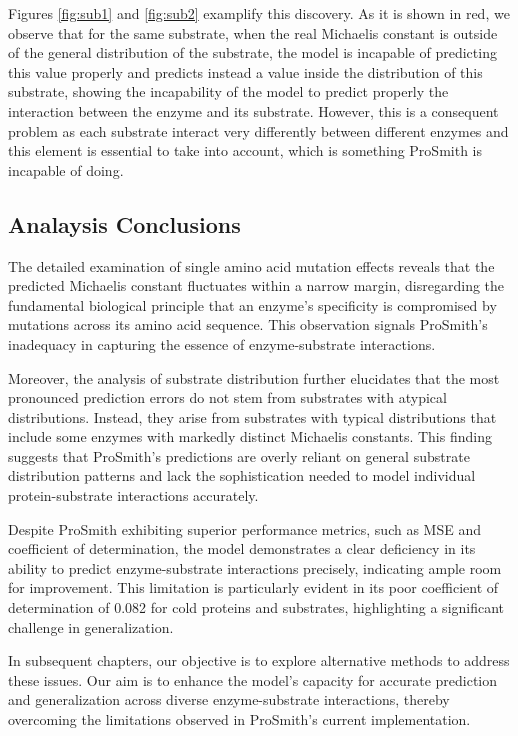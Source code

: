 Figures \ref{fig:sub1} and \ref{fig:sub2} examplify this discovery. As it is shown in red, we observe that for the same substrate, when the real Michaelis constant is outside of the general distribution of the substrate, the model is incapable of predicting this value properly and predicts instead a value inside the distribution of this substrate, showing the incapability of the model to predict properly the interaction between the enzyme and its substrate. However, this is a consequent problem as each substrate interact very differently between different enzymes and this element is essential to take into account, which is something ProSmith is incapable of doing.

\subsection{Analaysis Conclusions}

The detailed examination of single amino acid mutation effects reveals that the predicted Michaelis constant fluctuates within a narrow margin, disregarding the fundamental biological principle that an enzyme's specificity is compromised by mutations across its amino acid sequence. This observation signals ProSmith's inadequacy in capturing the essence of enzyme-substrate interactions.

Moreover, the analysis of substrate distribution further elucidates that the most pronounced prediction errors do not stem from substrates with atypical distributions. Instead, they arise from substrates with typical distributions that include some enzymes with markedly distinct Michaelis constants. This finding suggests that ProSmith's predictions are overly reliant on general substrate distribution patterns and lack the sophistication needed to model individual protein-substrate interactions accurately.

Despite ProSmith exhibiting superior performance metrics, such as MSE and coefficient of determination, the model demonstrates a clear deficiency in its ability to predict enzyme-substrate interactions precisely, indicating ample room for improvement. This limitation is particularly evident in its poor coefficient of determination of 0.082 for cold proteins and substrates, highlighting a significant challenge in generalization.

In subsequent chapters, our objective is to explore alternative methods to address these issues. Our aim is to enhance the model's capacity for accurate prediction and generalization across diverse enzyme-substrate interactions, thereby overcoming the limitations observed in ProSmith's current implementation.

